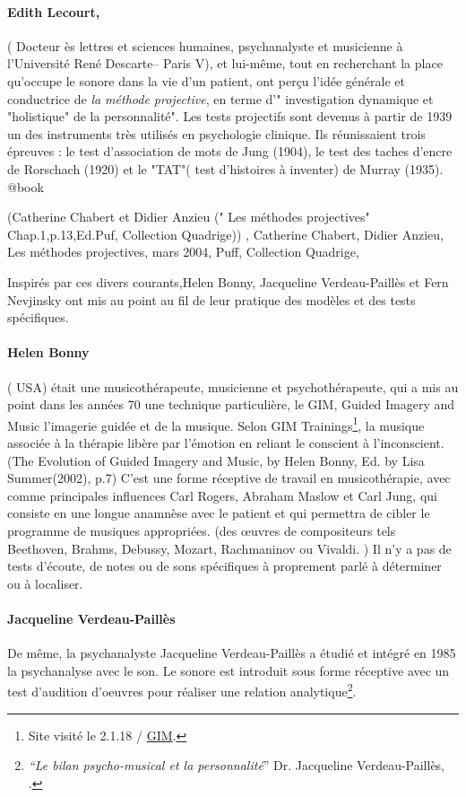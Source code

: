 	 \paragraph*{ Edith Lecourt, }( Docteur ès lettres et sciences humaines, psychanalyste et musicienne à l'Université René Descarte-- Paris V), et lui-même, tout en recherchant la place qu'occupe le sonore dans la vie d'un patient, ont perçu l'idée générale et conductrice de \textsl{la méthode projective}, en terme 
	d'" investigation dynamique et "holistique" de la personnalité". {Les  tests projectifs } sont devenus à partir de 1939 un des instruments très utilisés en psychologie clinique. Ils  réunissaient trois épreuves : le test d'association de mots de Jung (1904), le test des taches d'encre de Rorschach (1920) et le "TAT"( test d'histoires à inventer) de Murray (1935). @book{ (Catherine Chabert et Didier Anzieu (" Les méthodes projectives" Chap.1,p.13,Ed.Puf, Collection Quadrige))
,
		{Catherine Chabert, Didier Anzieu},
		{Les méthodes projectives},
		{mars 2004},
		{Puff, Collection Quadrige},
		
	
	}
	
Inspirés par ces divers courants,Helen Bonny, Jacqueline Verdeau-Paillès et Fern Nevjinsky ont  mis au point au fil de leur pratique des modèles et des tests spécifiques. 


\paragraph{Helen Bonny } ( USA) était une musicothérapeute,
musicienne et psychothérapeute, qui a mis au point dans les années 70
une technique particulière, le GIM, \og Guided Imagery and Music\fg
l'imagerie guidée et de la musique. Selon GIM
Trainings\footnote{Site visité le 2.1.18 / \href{\#gimsite}{GIM}.}, la
musique associée à la thérapie libère par l'émotion en reliant le
conscient à l'inconscient.(The Evolution of Guided Imagery and Music, by Helen Bonny, Ed. by Lisa Summer(2002), p.7)
 C'est une forme réceptive de travail
en musicothérapie, avec comme principales influences Carl Rogers, Abraham Maslow et Carl Jung,  qui consiste en une longue anamnèse avec le
patient et  qui permettra de cibler le programme de musiques appropriées. 
(des \oe uvres de compositeurs tels Beethoven, Brahms, Debussy,
Mozart, Rachmaninov ou Vivaldi. )
Il n'y a  pas de
tests d'écoute, de notes ou de sons spécifiques à proprement parlé à déterminer ou à localiser.

\paragraph{Jacqueline Verdeau-Paillès}De même, la psychanalyste Jacqueline Verdeau-Paillès a étudié et
intégré en 1985 la psychanalyse avec le son.  Le sonore est  introduit
sous forme réceptive avec un test d'audition d'oeuvres pour réaliser
une relation analytique\footnote{\emph{``Le bilan psycho-musical et la
    personnalité}'' Dr. Jacqueline Verdeau-Paillès,
  \cite{verdeau-pailles}.}.

